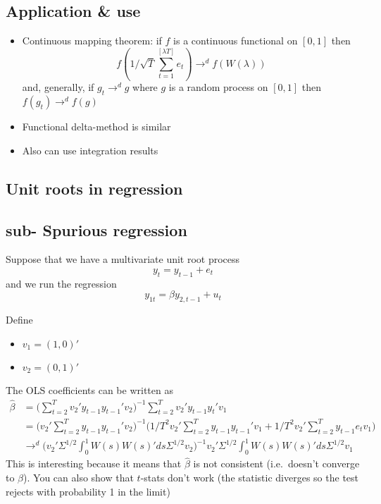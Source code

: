 \subsection{Application \& use}

\begin{itemize}
\item Continuous mapping theorem: if $f$ is a continuous functional on
  $[0,1]$ then \[f(1/\sqrt{T} \sum_{t=1}^{[\lambda T]} e_t) \to^d f(W(\lambda))\]
  and, generally, if $g_t \to^d g$ where $g$ is a random process on
  $[0,1]$ then $f(g_t) \to^d f(g)$
\item Functional delta-method is similar
\item Also can use integration results
\end{itemize}

\subsection{Unit roots in regression}

\subsection{sub- Spurious regression}

Suppose that we have a multivariate unit root process
\[y_t = y_{t-1} + e_t\] and we run the regression
\[y_{1t} = \beta y_{2,t-1} + u_t\]

Define

\begin{itemize}
\item $v_1 = (1, 0)'$
\item $v_2 = (0, 1)'$
\end{itemize}

The OLS coefficients can be written as
\begin{equation}
  \begin{split}
    \hat \beta &= \Big(\sum_{t=2}^T v_2' y_{t-1} y_{t-1}' v_2\Big)^{-1}
    \sum_{t=2}^T v_2' y_{t-1} y_t' v_1 \\
    &= \Big(v_2' \sum_{t=2}^T y_{t-1} y_{t-1}' v_2 \Big)^{-1} \Big(
    1/T^2 v_2' \sum_{t=2}^T y_{t-1} y_{t-1}' v_1
    + 1/T^2 v_2' \sum_{t=2}^T y_{t-1} e_t v_1 \Big) \\
    &\to^d \Big(v_2' \Sigma^{1/2} \int_0^1 W(s) W(s)' ds \Sigma^{1/2}
    v_2\Big)^{-1} v_2' \Sigma^{1/2} \int_0^1 W(s) W(s)' ds \Sigma^{1/2} v_1
\end{split}
\end{equation}
This is interesting because it means that $\hat \beta$ is not consistent
(i.e.~doesn't converge to $\beta$). You can also show that $t$-stats don't
work (the statistic diverges so the test rejects with probability 1 in
the limit)

